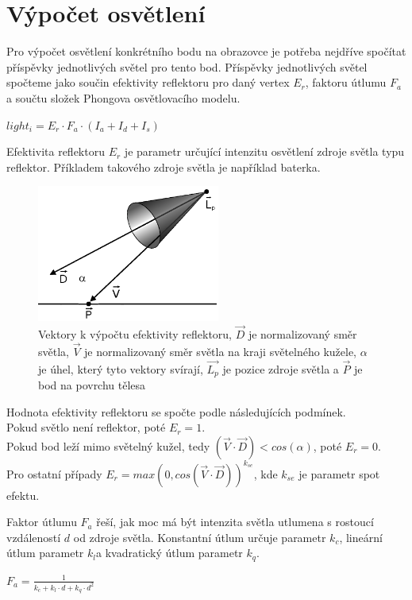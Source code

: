 \documentclass[11pt,twoside,a4paper]{book}
\begin{document}
\section{Výpočet osvětlení}

Pro výpočet osvětlení konkrétního bodu na obrazovce je potřeba nejdříve spočítat příspěvky jednotlivých světel pro tento bod. Příspěvky jednotlivých světel spočteme jako součin efektivity reflektoru pro daný vertex $E_r$, faktoru útlumu $F_a$ a součtu složek Phongova osvětlovacího modelu.
\begin{center}
$light_i = E_r \cdot F_a \cdot (I_a + I_d + I_s)$
\end{center}

Efektivita reflektoru $E_r$ je parametr určující intenzitu osvětlení zdroje světla typu reflektor. Příkladem takového zdroje světla je například baterka.
\begin{center}
\begin{figure}[h!]
\includegraphics[width=60mm]{figures/cutoff.png}
\caption{Vektory k výpočtu efektivity reflektoru, $\vec{D}$ je normalizovaný směr světla, $\vec{V}$ je normalizovaný směr světla na kraji světelného kužele, $\alpha$ je úhel, který tyto vektory svírají, $\vec{L_p}$ je pozice zdroje světla a $\vec{P}$ je bod na povrchu tělesa}
\end{figure}
\end{center}

Hodnota efektivity reflektoru se spočte podle následujících podmínek.\\
Pokud světlo není reflektor, poté $E_r = 1$.\\
Pokud bod leží mimo světelný kužel, tedy $(\vec{V} \cdot \vec{D}) < cos(\alpha)$, poté $E_r = 0$.\\
Pro ostatní případy $E_r = max(0, cos(\vec{V} \cdot \vec{D}))^{k_{se}}$, kde $k_{se}$ je parametr spot efektu.
\newpage

Faktor útlumu $F_a$ řeší, jak moc má být intenzita světla utlumena s rostoucí vzdáleností $d$ od zdroje světla. Konstantní útlum určuje parametr $k_c$, lineární útlum parametr $k_l$\linebreak a kvadratický útlum parametr $k_q$.
\begin{center}
$F_a = \frac{1}{k_c + k_l \cdot d + k_q \cdot d^2}$
\end{center}
\bigskip
\end{document}
